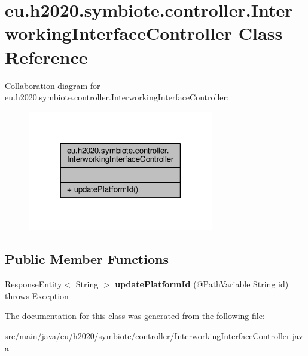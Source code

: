\hypertarget{classeu_1_1h2020_1_1symbiote_1_1controller_1_1InterworkingInterfaceController}{}\section{eu.\+h2020.\+symbiote.\+controller.\+Interworking\+Interface\+Controller Class Reference}
\label{classeu_1_1h2020_1_1symbiote_1_1controller_1_1InterworkingInterfaceController}


Collaboration diagram for eu.\+h2020.\+symbiote.\+controller.\+Interworking\+Interface\+Controller\+:\nopagebreak
\begin{figure}[H]
\begin{center}
\leavevmode
\includegraphics[width=230pt]{classeu_1_1h2020_1_1symbiote_1_1controller_1_1InterworkingInterfaceController__coll__graph}
\end{center}
\end{figure}
\subsection*{Public Member Functions}
\begin{DoxyCompactItemize}
\item 
\mbox{\label{classeu_1_1h2020_1_1symbiote_1_1controller_1_1InterworkingInterfaceController_a6ff9bf0ef30e7e2a34b2d89e77399a59}} 
Response\+Entity$<$ String $>$ {\bfseries update\+Platform\+Id} (@Path\+Variable String id)  throws Exception 
\end{DoxyCompactItemize}


The documentation for this class was generated from the following file\+:\begin{DoxyCompactItemize}
\item 
src/main/java/eu/h2020/symbiote/controller/Interworking\+Interface\+Controller.\+java\end{DoxyCompactItemize}
